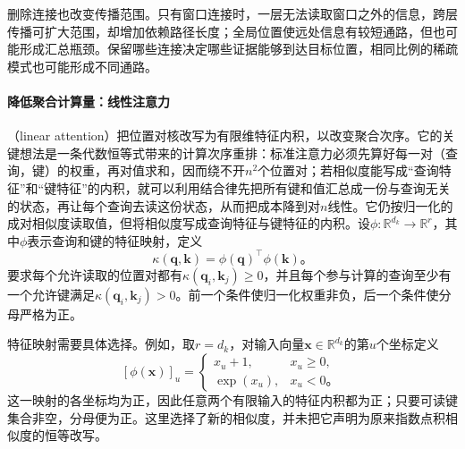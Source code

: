 删除连接也改变传播范围。只有窗口连接时，一层无法读取窗口之外的信息，跨层传播可扩大范围，却增加依赖路径长度；全局位置使远处信息有较短通路，但也可能形成汇总瓶颈。保留哪些连接决定哪些证据能够到达目标位置，相同比例的稀疏模式也可能形成不同通路。

\paragraph{降低聚合计算量：线性注意力}

（linear attention）把位置对核改写为有限维特征内积，以改变聚合次序。它的关键想法是一条代数恒等式带来的计算次序重排：标准注意力必须先算好每一对（查询，键）的权重，再对值求和，因而绕不开$n^2$个位置对；若相似度能写成“查询特征”和“键特征”的内积，就可以利用结合律先把所有键和值汇总成一份与查询无关的状态，再让每个查询去读这份状态，从而把成本降到对$n$线性。它仍按归一化的成对相似度读取值，但将相似度写成查询特征与键特征的内积。设$\phi:\mathbb R^{d_k}\to\mathbb R^r$，其中$\phi$表示查询和键的特征映射，定义
\[
  \kappa(\bm q,\bm k)=\phi(\bm q)^{\top}\phi(\bm k)\text{。}
\]
要求每个允许读取的位置对都有$\kappa(\bm q_i,\bm k_j)\geq0$，并且每个参与计算的查询至少有一个允许键满足$\kappa(\bm q_i,\bm k_j)>0$。前一个条件使归一化权重非负，后一个条件使分母严格为正。

特征映射需要具体选择。例如，取$r=d_k$，对输入向量$\bm x\in\mathbb R^{d_k}$的第$u$个坐标定义
\[
  [\phi(\bm x)]_u=
  \begin{cases}
    x_u+1,&x_u\geq0,\\
    \exp(x_u),&x_u<0\text{。}
  \end{cases}
\]
这一映射的各坐标均为正，因此任意两个有限输入的特征内积都为正；只要可读键集合非空，分母便为正。这里选择了新的相似度，并未把它声明为原来指数点积相似度的恒等改写。


